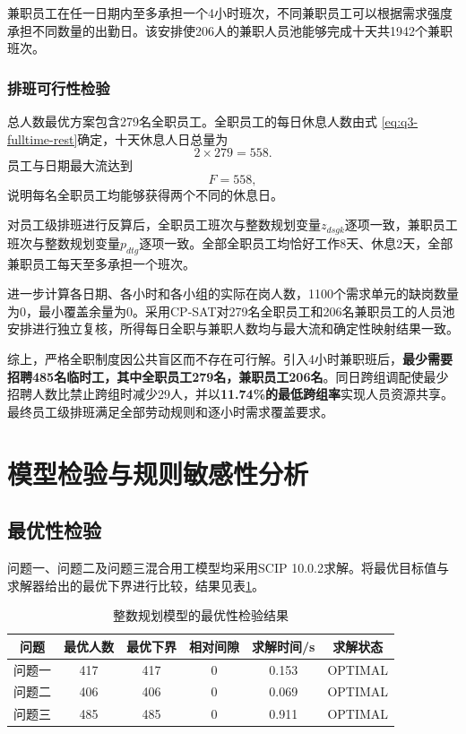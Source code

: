 \documentclass[withoutpreface,bwprint]{cumcmthesis}
\begin{document}
兼职员工在任一日期内至多承担一个4小时班次，不同兼职员工可以根据需求强度承担不同数量的出勤日。该安排使206人的兼职人员池能够完成十天共1942个兼职班次。

\subsubsection{排班可行性检验}

总人数最优方案包含279名全职员工。全职员工的每日休息人数由式
\eqref{eq:q3-fulltime-rest}确定，十天休息人日总量为
\[
2\times279=558.
\]
员工与日期最大流达到
\[
F=558,
\]
说明每名全职员工均能够获得两个不同的休息日。

对员工级排班进行反算后，全职员工班次与整数规划变量$z_{dsgk}$逐项一致，兼职员工班次与整数规划变量$p_{dtg}$逐项一致。全部全职员工均恰好工作8天、休息2天，全部兼职员工每天至多承担一个班次。

进一步计算各日期、各小时和各小组的实际在岗人数，1100个需求单元的缺岗数量为0，最小覆盖余量为0。采用CP-SAT对279名全职员工和206名兼职员工的人员池安排进行独立复核，所得每日全职与兼职人数均与最大流和确定性映射结果一致。

综上，严格全职制度因公共盲区而不存在可行解。引入4小时兼职班后，\textbf{最少需要招聘485名临时工，其中全职员工279名，兼职员工206名}。同日跨组调配使最少招聘人数比禁止跨组时减少29人，并以\textbf{11.74\%的最低跨组率}实现人员资源共享。最终员工级排班满足全部劳动规则和逐小时需求覆盖要求。

\clearpage
\section{模型检验与规则敏感性分析}

\subsection{最优性检验}

问题一、问题二及问题三混合用工模型均采用SCIP 10.0.2求解。将最优目标值与求解器给出的最优下界进行比较，结果见表\ref{tab:optimality-check}。

\begin{table}[H]
\centering
\caption{整数规划模型的最优性检验结果}
\label{tab:optimality-check}
\begin{tabular}{cccccc}
\toprule
问题 & 最优人数 & 最优下界 & 相对间隙 & 求解时间/s & 求解状态\\
\midrule
问题一 & 417 & 417 & 0 & 0.153 & OPTIMAL\\
问题二 & 406 & 406 & 0 & 0.069 & OPTIMAL\\
问题三 & 485 & 485 & 0 & 0.911 & OPTIMAL\\
\bottomrule
\end{tabular}
\end{table}
\end{document}
